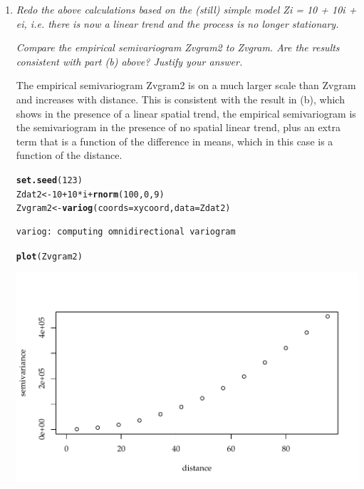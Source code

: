 \documentclass{article}\usepackage[]{graphicx}\usepackage[]{color}
\makeatletter
\def\maxwidth{ %
  \ifdim\Gin@nat@width>\linewidth
    \linewidth
  \else
    \Gin@nat@width
  \fi
}
\newcommand{\hlnum}[1]{\textcolor[rgb]{0.686,0.059,0.569}{#1}}%
\newcommand{\hlopt}[1]{\textcolor[rgb]{0,0,0}{#1}}%
\newcommand{\hlstd}[1]{\textcolor[rgb]{0.345,0.345,0.345}{#1}}%
\newcommand{\hlkwb}[1]{\textcolor[rgb]{0.69,0.353,0.396}{#1}}%
\newcommand{\hlkwc}[1]{\textcolor[rgb]{0.333,0.667,0.333}{#1}}%
\newcommand{\hlkwd}[1]{\textcolor[rgb]{0.737,0.353,0.396}{\textbf{#1}}}%
\newenvironment{kframe}{%
 \def\at@end@of@kframe{}%
 \ifinner\ifhmode%
  \def\at@end@of@kframe{\end{minipage}}%
  \begin{minipage}{\columnwidth}%
 \fi\fi%
 \def\FrameCommand##1{\hskip\@totalleftmargin \hskip-\fboxsep
 \colorbox{shadecolor}{##1}\hskip-\fboxsep
     \hskip-\linewidth \hskip-\@totalleftmargin \hskip\columnwidth}%
 \MakeFramed {\advance\hsize-\width
   \@totalleftmargin\z@ \linewidth\hsize
   \@setminipage}}%
 {\par\unskip\endMakeFramed%
 \at@end@of@kframe}
\newenvironment{knitrout}{}{} %
\makeatother
\begin{document}
\begin{enumerate}
\begin{enumerate}
\item {\it Redo the above calculations based on the (still) simple model Zi = 10 + 10i + ei, i.e. there is now a linear trend and the process is no longer stationary.}

\newpage

{\it Compare the empirical semivariogram Zvgram2 to Zvgram. Are the results consistent with part (b) above? Justify your answer.}

The empirical semivariogram Zvgram2 is on a much larger scale than Zvgram and increases with distance. This is consistent with the result in (b), which shows in the presence of a linear spatial trend, the empirical semivariogram is the semivariogram in the presence of no spatial linear trend, plus an extra term that is a function of the difference in means, which in this case is a function of the distance.

\begin{knitrout}\footnotesize
{}\color{fgcolor}\begin{kframe}
\begin{alltt}
\hlkwd{set.seed}\hlstd{(}\hlnum{123}\hlstd{)}
\hlstd{Zdat2}\hlkwb{<-}\hlnum{10} \hlopt{+}\hlnum{10}\hlopt{*}\hlstd{i} \hlopt{+} \hlkwd{rnorm}\hlstd{(}\hlnum{100}\hlstd{,}\hlnum{0}\hlstd{,}\hlnum{9}\hlstd{)}
\hlstd{Zvgram2}\hlkwb{<-}\hlkwd{variog}\hlstd{(}\hlkwc{coords}\hlstd{=xycoord,}\hlkwc{data}\hlstd{=Zdat2)}
\end{alltt}
\begin{verbatim}
variog: computing omnidirectional variogram
\end{verbatim}
\begin{alltt}
\hlkwd{plot}\hlstd{(Zvgram2)}
\end{alltt}
\end{kframe}

{\centering \includegraphics[width=\maxwidth]{figure/prob2d-1} 

}
\end{knitrout}
\end{enumerate}
\end{enumerate}
\end{document}
